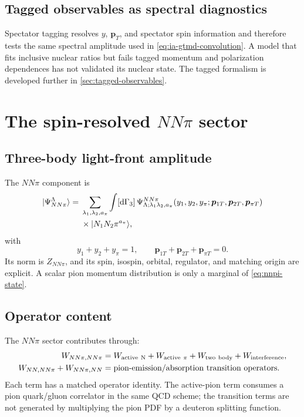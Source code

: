 \documentclass[11pt]{article}
\newcommand{\pT}{\bm{p}_{T}}
\newcommand{\dd}{\mathrm{d}}
\newcommand{\NN}{NN}
\newcommand{\NNpi}{NN\pi}
\begin{document}
\subsection{Tagged observables as spectral diagnostics}

Spectator tagging resolves \(y\), \(\pT\), and spectator spin information and
therefore tests the same spectral amplitude used in
\cref{eq:ia-gtmd-convolution}.  A model that fits inclusive nuclear ratios but
fails tagged momentum and polarization dependences has not validated its
nuclear state.  The tagged formalism is developed further in
\cref{sec:tagged-observables}.

\section{The spin-resolved \texorpdfstring{\(NN\pi\)}{NNpi} sector}
\label{sec:nnpi}

\subsection{Three-body light-front amplitude}

The \(NN\pi\) component is
\begin{align}
 |\Psi_{\NNpi}^{\Lambda}\rangle
 ={}&\sum_{\lambda_1,\lambda_2,a_\pi}
 \int[\dd\Gamma_3]\,
 \Psi_{\Lambda;\lambda_1\lambda_2,a_\pi}^{\NNpi}
 (y_1,y_2,y_\pi;\bm p_{1T},\bm p_{2T},\bm p_{\pi T})
 \notag\\
 &\times
 |N_1N_2\pi^{a_\pi}\rangle,
\label{eq:nnpi-state}
\end{align}
with
\begin{equation}
 y_1+y_2+y_\pi=1,
 \qquad
 \bm p_{1T}+\bm p_{2T}+\bm p_{\pi T}=0.
\label{eq:nnpi-closure}
\end{equation}
Its norm is \(Z_{\NNpi}\), and its spin, isospin, orbital, regulator, and
matching origin are explicit.  A scalar pion momentum distribution is only a
marginal of \cref{eq:nnpi-state}.

\subsection{Operator content}

The \(NN\pi\) sector contributes through:
\begin{align}
 W_{\NNpi,\NNpi}
 ={}&W_{\rm active\ N}
 +W_{\rm active\ \pi}
 +W_{\rm two\ body}
 +W_{\rm interference},
\label{eq:nnpi-diagonal-content}\\
 W_{\NN,\NNpi}+W_{\NNpi,\NN}
 ={}&\text{pion-emission/absorption transition operators}.
\label{eq:nn-nnpi-transition}
\end{align}
Each term has a matched operator identity.  The active-pion term consumes a
pion quark/gluon correlator in the same QCD scheme; the transition terms are
not generated by multiplying the pion PDF by a deuteron splitting function.
\end{document}
